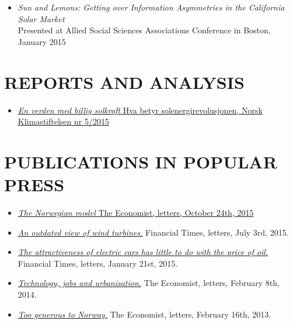 \documentclass[margin]{res}
\begin{document}
\begin{resume}
\begin{itemize}
\item[] \emph {Sun and Lemons: Getting over Information Asymmetries in the California Solar Market} \\
Presented at Allied Social Sciences Associations Conference in Boston, January 2015 \\
\end{itemize}

\section{REPORTS AND ANALYSIS} 
\begin{itemize} 
\setlength{\itemsep}{5pt}
\item[] \href{http://klimastiftelsen.no/wp-content/uploads/2015/06/NK5_2015_Solenergirevolusjonen.pdf}{\emph{En verden med billig solkraft} Hva betyr solenergirevolusjonen, Norsk Klimastiftelsen nr 5/2015} 
\end{itemize}

\section{PUBLICATIONS IN POPULAR PRESS} 
\begin{itemize} 
\setlength{\itemsep}{5pt}
\item[] \href{http://www.economist.com/news/letters/21676738-letters}{\emph{The Norwegian model} The Economist, letters, October 24th, 2015}

\item[] \href{http://www.ft.com/intl/cms/s/0/e22cba5c-1bfa-11e5-a130-2e7db721f996.html#axzz3giRBkRau}{\emph{An outdated view of wind turbines.}} Financial Times, letters, July 3rd, 2015.

\item[] \href{http://www.ft.com/intl/cms/s/0/313360bc-a00c-11e4-aa89-00144feab7de.html#axzz3PVKMfhY5}{\emph{The attractiveness of electric cars has little to do with the price of oil.}} Financial Times, letters, January 21st, 2015.

\item[] \href{http://www.economist.com/news/letters/21595871-livestock-and-emissions-california-technology-and-jobs-algorithms}{\emph{Technology, jobs and urbanisation.}}   The Economist, letters, February 8th, 2014.

\item[] \href{http://www.economist.com/news/letters/21571848-nordic-countries-private-schools-immigration-sandhurst-ed-koch-richard-iii}{\emph{Too generous to Norway.}} The Economist, letters, February 16th, 2013.


\end{itemize}
\end{resume}
\end{document}
